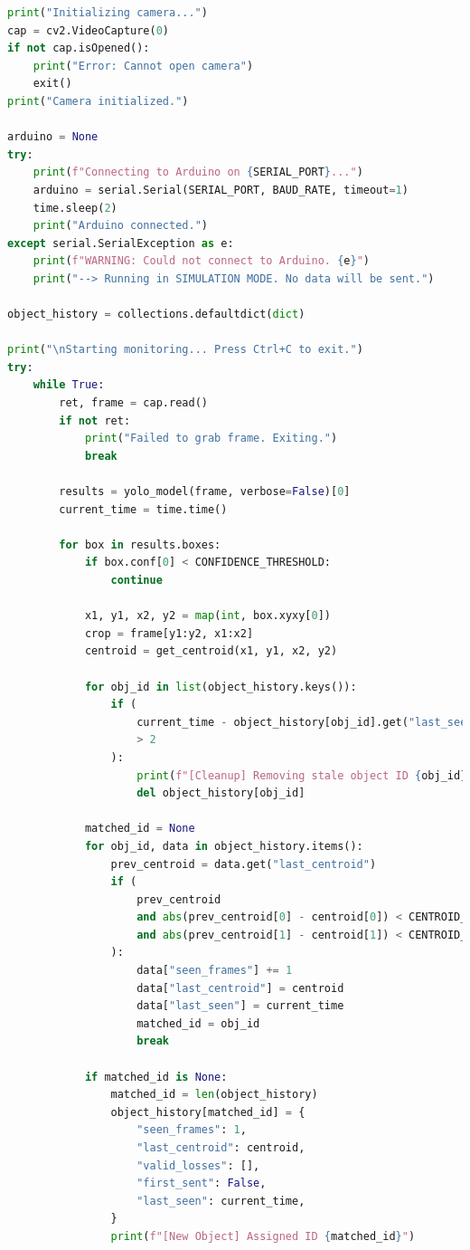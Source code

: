 \begin{lstlisting}[language=Python]
print("Initializing camera...")
cap = cv2.VideoCapture(0)
if not cap.isOpened():
    print("Error: Cannot open camera")
    exit()
print("Camera initialized.")

arduino = None
try:
    print(f"Connecting to Arduino on {SERIAL_PORT}...")
    arduino = serial.Serial(SERIAL_PORT, BAUD_RATE, timeout=1)
    time.sleep(2)
    print("Arduino connected.")
except serial.SerialException as e:
    print(f"WARNING: Could not connect to Arduino. {e}")
    print("--> Running in SIMULATION MODE. No data will be sent.")

object_history = collections.defaultdict(dict)

print("\nStarting monitoring... Press Ctrl+C to exit.")
try:
    while True:
        ret, frame = cap.read()
        if not ret:
            print("Failed to grab frame. Exiting.")
            break

        results = yolo_model(frame, verbose=False)[0]
        current_time = time.time()

        for box in results.boxes:
            if box.conf[0] < CONFIDENCE_THRESHOLD:
                continue

            x1, y1, x2, y2 = map(int, box.xyxy[0])
            crop = frame[y1:y2, x1:x2]
            centroid = get_centroid(x1, y1, x2, y2)

            for obj_id in list(object_history.keys()):
                if (
                    current_time - object_history[obj_id].get("last_seen", current_time)
                    > 2
                ):
                    print(f"[Cleanup] Removing stale object ID {obj_id}")
                    del object_history[obj_id]

            matched_id = None
            for obj_id, data in object_history.items():
                prev_centroid = data.get("last_centroid")
                if (
                    prev_centroid
                    and abs(prev_centroid[0] - centroid[0]) < CENTROID_TOLERANCE
                    and abs(prev_centroid[1] - centroid[1]) < CENTROID_TOLERANCE
                ):
                    data["seen_frames"] += 1
                    data["last_centroid"] = centroid
                    data["last_seen"] = current_time
                    matched_id = obj_id
                    break

            if matched_id is None:
                matched_id = len(object_history)
                object_history[matched_id] = {
                    "seen_frames": 1,
                    "last_centroid": centroid,
                    "valid_losses": [],
                    "first_sent": False,
                    "last_seen": current_time,
                }
                print(f"[New Object] Assigned ID {matched_id}")


\end{lstlisting}
